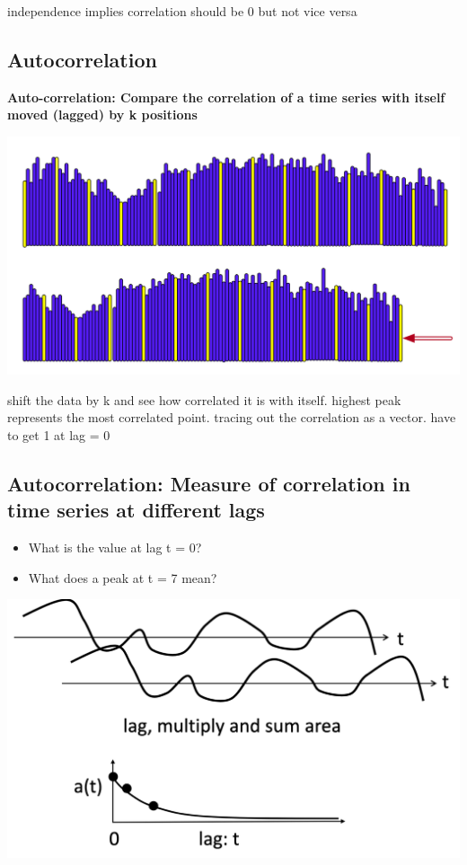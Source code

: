 \documentclass[11pt]{article}
\theoremstyle{definition}
\begin{document}
independence implies correlation should be 0 but not vice versa

\subsection{Autocorrelation}
\textbf{Auto-correlation: Compare the correlation of a time series with itself
moved (lagged) by k positions}

\includegraphics[width=\textwidth/2]{7.png}

shift the data by k and see how correlated it is with itself. highest peak represents
the most correlated point. tracing out the correlation as a vector. have to get 1 at lag = 0

\subsection{Autocorrelation:
Measure of correlation in time series
at different lags}

\begin{itemize}
  \item What is the value at lag t = 0?
  \item What does a peak at t = 7 mean?
\end{itemize}

\includegraphics[width=\textwidth/2]{8.png}
\end{document}

